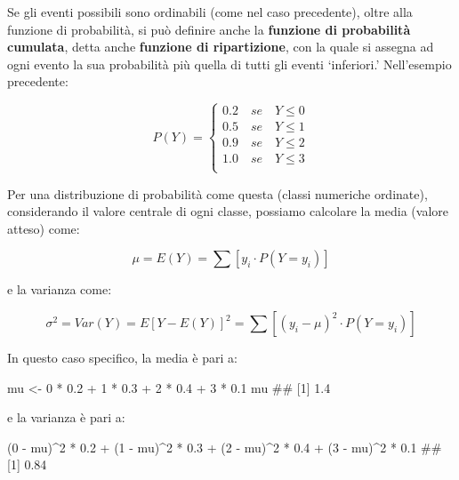 \documentclass[a4paper,12pt,oneside]{book}
\newenvironment{Shaded}{\begin{snugshade}}{\end{snugshade}}
\newcommand{\DecValTok}[1]{#1}
\newcommand{\FloatTok}[1]{#1}
\newcommand{\SpecialCharTok}[1]{#1}
\newcommand{\DocumentationTok}[1]{#1}
\newcommand{\OtherTok}[1]{#1}
\newcommand{\NormalTok}[1]{#1}
\begin{document}
Se gli eventi possibili sono ordinabili (come nel caso precedente), oltre alla funzione di probabilità, si può definire anche la \textbf{funzione di probabilità cumulata}, detta anche \textbf{funzione di ripartizione}, con la quale si assegna ad ogni evento la sua probabilità più quella di tutti gli eventi `inferiori.' Nell'esempio precedente:

\[
P(Y) = \left\{ \begin{array}{l}
 0.2\,\,\,\,\,\,se\,\,\,\,\,\,Y \leq 0 \\ 
 0.5\,\,\,\,\,\,se\,\,\,\,\,\,Y \leq 1 \\ 
 0.9\,\,\,\,\,\,se\,\,\,\,\,\,Y \leq 2 \\ 
 1.0\,\,\,\,\,\,se\,\,\,\,\,\,Y \leq 3 \\ 
 \end{array} \right.
\]

Per una distribuzione di probabilità come questa (classi numeriche ordinate), considerando il valore centrale di ogni classe, possiamo calcolare la media (valore atteso) come:

\[
\mu  = E(Y) = \sum{\left[ y_i \cdot P(Y = y_i ) \right]}
\]

e la varianza come:

\[\sigma ^2  = Var(Y) = E\left[ {Y - E(Y)} \right]^2  = \sum{ \left[ {\left( {y_i  - \mu } \right)^2 \cdot P(Y = y_i )} \right]}\]

In questo caso specifico, la media è pari a:

\begin{Shaded}
\begin{Highlighting}[]
\NormalTok{mu }\OtherTok{\textless{}{-}} \DecValTok{0} \SpecialCharTok{*} \FloatTok{0.2} \SpecialCharTok{+} \DecValTok{1} \SpecialCharTok{*} \FloatTok{0.3} \SpecialCharTok{+} \DecValTok{2} \SpecialCharTok{*} \FloatTok{0.4} \SpecialCharTok{+} \DecValTok{3} \SpecialCharTok{*} \FloatTok{0.1}
\NormalTok{mu}
\DocumentationTok{\#\# [1] 1.4}
\end{Highlighting}
\end{Shaded}

e la varianza è pari a:

\begin{Shaded}
\begin{Highlighting}[]
\NormalTok{(}\DecValTok{0} \SpecialCharTok{{-}}\NormalTok{ mu)}\SpecialCharTok{\^{}}\DecValTok{2} \SpecialCharTok{*} \FloatTok{0.2} \SpecialCharTok{+}\NormalTok{ (}\DecValTok{1} \SpecialCharTok{{-}}\NormalTok{ mu)}\SpecialCharTok{\^{}}\DecValTok{2} \SpecialCharTok{*} \FloatTok{0.3} \SpecialCharTok{+}\NormalTok{ (}\DecValTok{2} \SpecialCharTok{{-}}\NormalTok{ mu)}\SpecialCharTok{\^{}}\DecValTok{2} \SpecialCharTok{*} \FloatTok{0.4} \SpecialCharTok{+}
\NormalTok{  (}\DecValTok{3} \SpecialCharTok{{-}}\NormalTok{ mu)}\SpecialCharTok{\^{}}\DecValTok{2} \SpecialCharTok{*} \FloatTok{0.1}
\DocumentationTok{\#\# [1] 0.84}
\end{Highlighting}
\end{Shaded}
\end{document}
